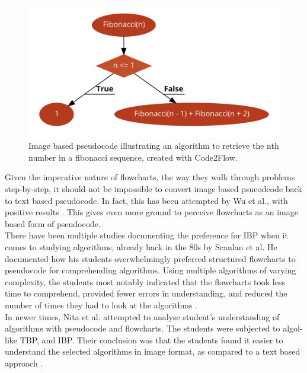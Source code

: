 \begin{figure}[ht]
    \centering
    \includegraphics[scale=0.46]{assets/fibonacci_flowchart.png}
    \caption{Image based pseudocode illustrating an algorithm to retrieve the nth number in a fibonacci sequence, created with Code2Flow.}
    \label{fig:fibseq1}
\end{figure}

Given the imperative nature of flowcharts, the way they walk through problems step-by-step, it should not be impossible to convert image based psueodcode back to text based pseudocode. In fact, this has been attempted by Wu et al., with positive results \cite{codeFromFlowcharts}. This gives even more ground to perceive flowcharts as an image based form of pseudocode. \hfill \\

There have been multiple studies documenting the preference for IBP when it comes to studying algorithms, already back in the 80s by Scanlan et al. He documented how his students overwhelmingly preferred structured flowcharts to pseudocode for comprehending algorithms. Using multiple algorithms of varying complexity, the students most notably indicated that the flowcharts took less time to comprehend, provided fewer errors in understanding, and reduced the number of times they had to look at the algorithms \cite{DBLP:journals/software/Scanlan89}. \hfill \\

In newer times, Nita et al. attempted to analyse student's understanding of algorithms with pseudocode and flowcharts. The students were subjected to algol-like TBP, and IBP. Their conclusion was that the students found it easier to understand the selected algorithms in image format, as compared to a text based approach \cite{Nita_2020}.


